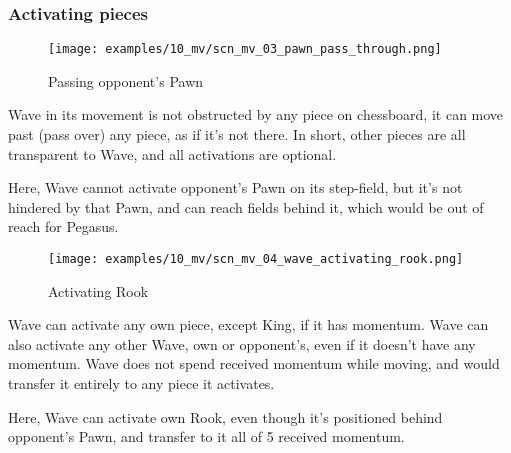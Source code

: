 \clearpage %

\subsubsection*{Activating pieces}
\label{sec:Miranda's veil/Wave/Activation/Activating pieces}

\vspace*{-1.5\baselineskip}
\noindent
\begin{figure}[!h]
\texttt{[image: examples/10\_mv/scn\_mv\_03\_pawn\_pass\_through.png]}
\vspace*{-1.4\baselineskip}
\caption{Passing opponent's Pawn}
\label{fig:scn_mv_03_pawn_pass_through}
\end{figure}

\vspace*{-0.5\baselineskip}
Wave in its movement is not obstructed by any piece on chessboard, it can move
past (pass over) any piece, as if it's not there. In short, other pieces are
all transparent to Wave, and all activations are optional.

Here, Wave cannot activate opponent's Pawn on its step-field, but it's not
hindered by that Pawn, and can reach fields behind it, which would be out of
reach for Pegasus.

\clearpage %

\vspace*{-2.1\baselineskip}
\noindent
\begin{figure}[!h]
\texttt{[image: examples/10\_mv/scn\_mv\_04\_wave\_activating\_rook.png]}
\vspace*{-1.3\baselineskip}
\caption{Activating Rook}
\label{fig:scn_mv_04_wave_activating_rook}
\end{figure}

\vspace*{-0.3\baselineskip}
Wave can activate any own piece, except King, if it has momentum. Wave can also
activate any other Wave, own or opponent's, even if it doesn't have any momentum.
Wave does not spend received momentum while moving, and would transfer it entirely
to any piece it activates.

Here, Wave can activate own Rook, even though it's positioned behind opponent's
Pawn, and transfer to it all of 5 received momentum.

